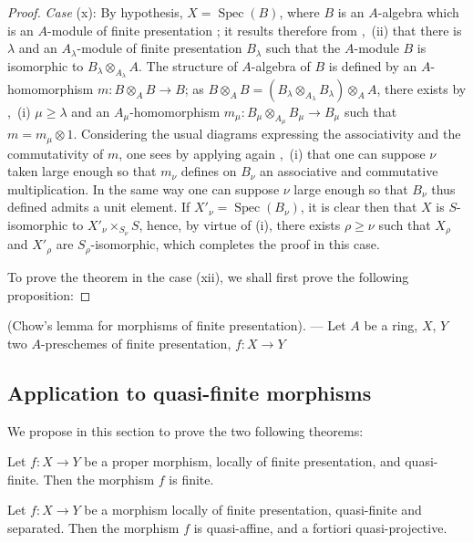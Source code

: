 \begin{proof}
\emph{Case} (x): By hypothesis, $X=\operatorname{Spec}(B)$, where $B$ is an $A$-algebra which is an $A$-module of finite presentation ; it results therefore from ,~(ii) that there is $\lambda$ and an $A_\lambda$-module of finite presentation $B_\lambda$ such that the $A$-module $B$ is isomorphic to $B_\lambda\otimes_{A_\lambda}A$.
The structure of $A$-algebra of $B$ is defined by an $A$-homomorphism $m:B\otimes_A B\to B$; as $B\otimes_A B=(B_\lambda\otimes_{A_\lambda}B_\lambda)\otimes_A A$, there exists by ,~(i) $\mu\geqslant\lambda$ and an $A_\mu$-homomorphism $m_\mu:B_\mu\otimes_{A_\mu}B_\mu\to B_\mu$ such that $m=m_\mu\otimes 1$.
Considering the usual diagrams expressing the associativity and the commutativity of $m$, one sees by applying again ,~(i) that one can suppose $\nu$ taken large enough so that $m_\nu$ defines on $B_\nu$ an associative and commutative multiplication.
In the same way one can suppose $\nu$ large enough so that $B_\nu$ thus defined admits a unit element.
If $X'_\nu=\operatorname{Spec}(B_\nu)$, it is clear then that $X$ is $S$-isomorphic to $X'_\nu\times_{S_\nu}S$, hence, by virtue of (i), there exists $\rho\geqslant\nu$ such that $X_\rho$ and $X'_\rho$ are $S_\rho$-isomorphic, which completes the proof in this case.

To prove the theorem in the case (xii), we shall first prove the following proposition:
\end{proof}

\begin{proposition}[8.10.5.1]
\label{IV.8.10.5.1}
(Chow's lemma for morphisms of finite presentation). --- Let $A$ be a ring, $X$, $Y$ two $A$-preschemes of finite presentation, $f:X\to Y$
\end{proposition}
\subsection{Application to quasi-finite morphisms}
\label{subsection:IV.8.11}

We propose in this section to prove the two following theorems:

\begin{theorem}[8.11.1]
\label{IV.8.11.1}
Let $f:X\to Y$ be a proper morphism, locally of finite presentation, and quasi-finite.
Then the morphism $f$ is finite.
\end{theorem}

\begin{theorem}[8.11.2]
\label{IV.8.11.2}
Let $f:X\to Y$ be a morphism locally of finite presentation, quasi-finite and separated.
Then the morphism $f$ is quasi-affine, and a fortiori quasi-projective.
\end{theorem}

